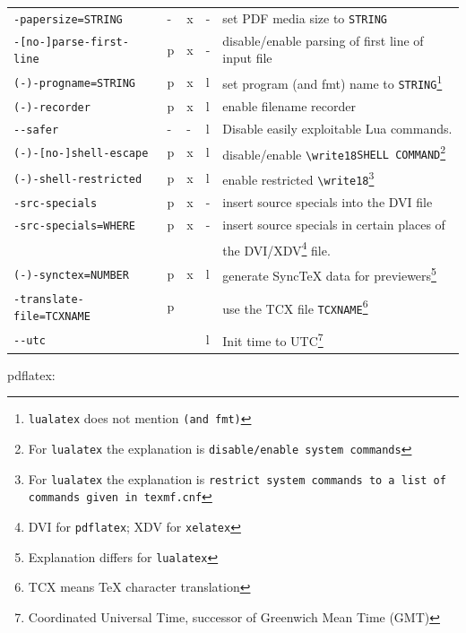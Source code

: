 \documentclass[a4paper]{article}%
\newcommand{\pdflatex}{\texttt{pdflatex}}
\newcommand{\lualatex}{\texttt{lualatex}}
\newcommand{\xelatex}{\texttt{xelatex}}
\begin{document}
{\begin{longtable}{lllll}
\texttt{-papersize=STRING}         & -&x&- & set PDF media size to \texttt{STRING} \\        
\texttt{-[no-]parse-first-line}    & p&x&- & disable/enable parsing of first line of input file \\
\texttt{(-)-progname=STRING}       & p&x&l & set program (and fmt) name to \texttt{STRING}\footnote%
{\lualatex{} does not mention \texttt{(and fmt)}} \\
\texttt{(-)-recorder}              & p&x&l & enable filename recorder \\
\texttt{-{}-safer}                 & -&-&l & Disable easily exploitable Lua commands. \\
\texttt{(-)-[no-]shell-escape}     & p&x&l & disable/enable \texttt{\textbackslash{}write18{SHELL COMMAND}}\footnote%
{For \lualatex{} the explanation is \texttt{disable/enable system commands}} \\
\texttt{(-)-shell-restricted}      & p&x&l & enable restricted \texttt{\textbackslash{}write18}\footnote%
{For \lualatex{} the explanation is \texttt{restrict system commands to a list of commands given in texmf.cnf}} \\
\texttt{-src-specials}             & p&x&- & insert source specials into the DVI file \\
\texttt{-src-specials=WHERE}       & p&x&- & insert source specials in certain places of \\
                                   &  & &  & the DVI/XDV\footnote{DVI for \pdflatex; XDV for \xelatex} file. \\
\texttt{(-)-synctex=NUMBER}        & p&x&l & generate SyncTeX data for previewers\footnote%
{Explanation differs for \lualatex} \\ 
\texttt{-translate-file=TCXNAME}   & p& &  & use the TCX file \texttt{TCXNAME}\footnote%
{TCX means \TeX{} character translation} \\
\texttt{-{}-utc}                   &  & &l & Init time to UTC\footnote{Coordinated Universal Time, 
successor of Greenwich Mean Time (GMT)} \\
\end{longtable}
} %





pdflatex: 
\end{document}
